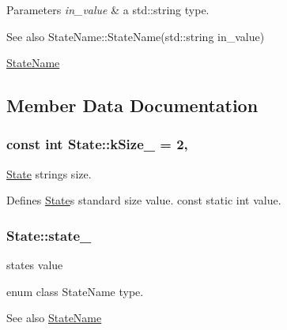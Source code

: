 \begin{DoxyParams}{Parameters}
{\em in\+\_\+value} & a std\+::string type.\\
\hline
\end{DoxyParams}
\begin{DoxySeeAlso}{See also}
State\+Name\+::\+State\+Name(std\+::string in\+\_\+value) 

\hyperlink{domain_8hpp_ac99446a312a3e7b8497ac6ec1f3ae080}{State\+Name} 
\end{DoxySeeAlso}


\subsection{Member Data Documentation}
\subsubsection[{\texorpdfstring{k\+Size\+\_\+}{kSize_}}]{\setlength{\rightskip}{0pt plus 5cm}const int State\+::k\+Size\+\_\+ = 2\hspace{0.3cm}{\ttfamily [static]}, {\ttfamily [private]}}\hypertarget{classState_a71e6c929e5e4ba6c76d74f1ca9325d33}{}\label{classState_a71e6c929e5e4ba6c76d74f1ca9325d33}


\hyperlink{classState}{State} string\textquotesingle{}s size. 

Defines \hyperlink{classState}{State}\textquotesingle{}s standard size value. const static int value. 
\subsubsection[{\texorpdfstring{state\+\_\+}{state_}}]{ State\+::state\+\_\+\hspace{0.3cm}{\ttfamily [private]}}\hypertarget{classState_ad8f1747b64fd9231e81157d873d5b246}{}\label{classState_ad8f1747b64fd9231e81157d873d5b246}


state\textquotesingle{}s value 

enum class State\+Name type.

\begin{DoxySeeAlso}{See also}
\hyperlink{domain_8hpp_ac99446a312a3e7b8497ac6ec1f3ae080}{State\+Name} 
\end{DoxySeeAlso}
